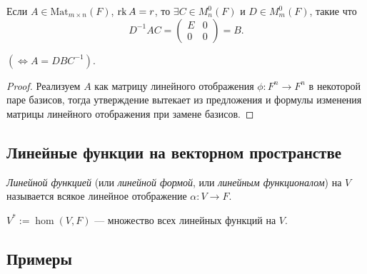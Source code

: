 \begin{corollary}
    Если $A \in \text{Mat}_{m \times n}(F)$, $\operatorname{\mathop{\mathrm{rk}}} A = r$, то $\exists C \in M_n^{0}(F)$ и $D \in M_m^{0}(F)$, такие что
    \begin{equation*}
        D^{-1}AC = \left(
            \begin{array}{c|c}
                E & 0 \\
                \hline
                0 & 0
            \end{array}
        \right) = B
    .\end{equation*}

    $(\iff A = DBC^{-1})$.
\end{corollary}

\begin{proof}
    Реализуем $A$ как матрицу линейного отображения $\phi \colon F^{n} \to F^n$ в некоторой паре базисов, тогда утверждение вытекает из предложения и формулы изменения матрицы линейного отображения при замене базисов.
\end{proof}


\subsection{Линейные функции на векторном пространстве}

\begin{definition}
    \textit{Линейной функцией} (или \textit{линейной формой}, или \textit{линейным функционалом}) на $V$ называется всякое линейное отображение $\alpha \colon V \to F$.
\end{definition}

\begin{designation}
    $V^{*} := \hom(V, F)$ --- множество всех линейных функций на $V$.
\end{designation}


\subsection{Примеры}

